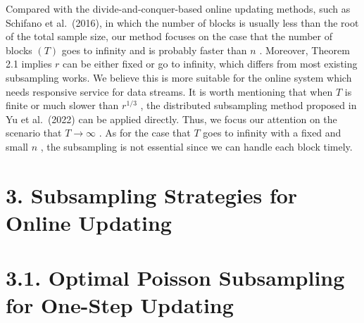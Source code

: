 \documentclass[
  10
]{article}
\begin{document}
Compared with the divide-and-conquer-based online updating methods, such
as Schifano et al.~(2016), in which the number of blocks is usually less
than the root of the total sample size, our method focuses on the case
that the number of blocks \(( T )\) goes to infinity and is probably
faster than \(n\) . Moreover, Theorem 2.1 implies \(r\) can be either
fixed or go to infinity, which differs from most existing subsampling
works. We believe this is more suitable for the online system which
needs responsive service for data streams. It is worth mentioning that
when \(T\) is finite or much slower than \(r ^ { 1 / 3 }\) , the
distributed subsampling method proposed in Yu et al.~(2022) can be
applied directly. Thus, we focus our attention on the scenario that
\(T \to \infty\) . As for the case that \(T\) goes to infinity with a
fixed and small \(n\) , the subsampling is not essential since we can
handle each block timely.

\section{3. Subsampling Strategies for Online
Updating}\label{subsampling-strategies-for-online-updating}

\section{3.1. Optimal Poisson Subsampling for One-Step
Updating}\label{optimal-poisson-subsampling-for-one-step-updating}
\end{document}
